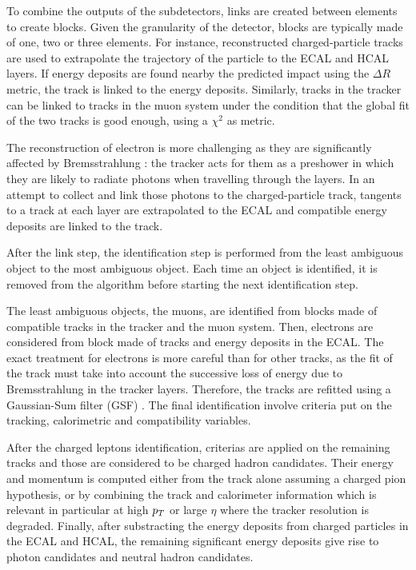         To combine the outputs of the subdetectors, links are created between elements
        to create blocks. Given the granularity of the detector, blocks are typically made
        of one, two or three elements. For instance, reconstructed charged-particle tracks
        are used to extrapolate the trajectory of the particle to the ECAL and HCAL layers.
        If energy deposits are found nearby the predicted impact using the $\Delta R$
        metric, the track is linked to the energy deposits. Similarly, tracks in the
        tracker can be linked to tracks in the muon system under the condition that the
        global fit of the two tracks is good enough, using a $\chi^2$ as metric.

        The reconstruction of electron is more challenging as they are significantly
        affected by Bremsstrahlung : the tracker acts for them as a preshower in which
        they are likely to radiate photons when travelling through the layers.
        In an attempt to collect and link those photons to the charged-particle track,
        tangents to a track at each layer are extrapolated to the ECAL and compatible
        energy deposits are linked to the track.

        After the link step, the identification step is performed from the least ambiguous
        object to the most ambiguous object. Each time an object is identified, it is
        removed from the algorithm before starting the next identification step.

        The least ambiguous objects, the muons, are identified from blocks made of compatible
        tracks in the tracker and the muon system. Then, electrons are considered from
        block made of tracks and energy deposits in the ECAL. The exact treatment for
        electrons is more careful than for other tracks, as the fit of the track must take
        into account the successive loss of energy due to Bremsstrahlung in the tracker
        layers. Therefore, the tracks are refitted using a Gaussian-Sum filter (GSF)
        . The final identification involve criteria put on the tracking,
        calorimetric and compatibility variables.

        After the charged leptons identification, criterias are applied on the remaining
        tracks and those are considered to be charged hadron candidates. Their energy
        and momentum is computed either from the track alone assuming a charged pion
        hypothesis, or by combining the track and calorimeter information which is relevant
        in particular at high $p_T$ or large $\eta$ where the tracker resolution is
        degraded. Finally, after substracting the energy deposits from charged particles
        in the ECAL and HCAL, the remaining significant energy deposits give rise to photon
        candidates and neutral hadron candidates.

